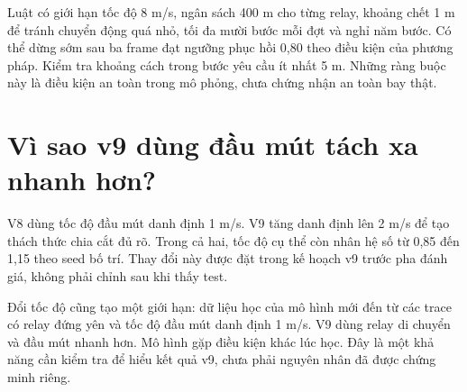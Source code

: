 
Luật có giới hạn tốc độ 8 m/s, ngân sách 400 m cho từng relay, khoảng chết 1 m để tránh chuyển động quá nhỏ, tối đa mười bước mỗi đợt và nghỉ năm bước. Có thể dừng sớm sau ba frame đạt ngưỡng phục hồi 0,80 theo điều kiện của phương pháp. Kiểm tra khoảng cách trong bước yêu cầu ít nhất 5 m. Những ràng buộc này là điều kiện an toàn trong mô phỏng, chưa chứng nhận an toàn bay thật.

\section{Vì sao v9 dùng đầu mút tách xa nhanh hơn?}
V8 dùng tốc độ đầu mút danh định 1 m/s. V9 tăng danh định lên 2 m/s để tạo thách thức chia cắt đủ rõ. Trong cả hai, tốc độ cụ thể còn nhân hệ số từ 0,85 đến 1,15 theo seed bố trí. Thay đổi này được đặt trong kế hoạch v9 trước pha đánh giá, không phải chỉnh sau khi thấy test.

Đổi tốc độ cũng tạo một giới hạn: dữ liệu học của mô hình mới đến từ các trace có relay đứng yên và tốc độ đầu mút danh định 1 m/s. V9 dùng relay di chuyển và đầu mút nhanh hơn. Mô hình gặp điều kiện khác lúc học. Đây là một khả năng cần kiểm tra để hiểu kết quả v9, chưa phải nguyên nhân đã được chứng minh riêng.


